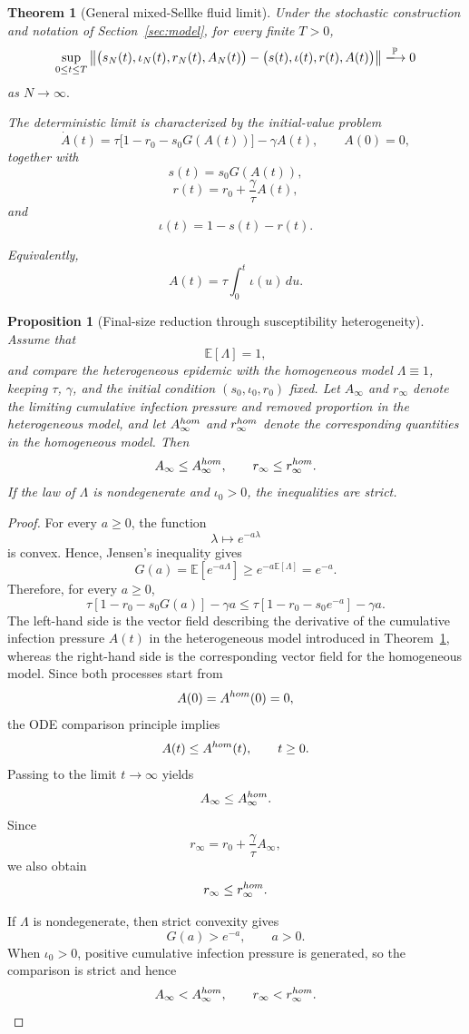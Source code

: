 \documentclass[10pt,a4paper]{amsart}
\newtheorem{theorem}{Theorem}
\newtheorem{proposition}{Proposition}
\newcommand{\E}{\mathbb{E}}
\newcommand{\Pp}{\mathbb{P}}
\begin{document}
\begin{theorem}[General mixed-Sellke fluid limit]\label{thm:1}
Under the stochastic construction and notation of Section~\ref{sec:model}, for every finite \(T>0\),
\[
\sup_{0\leq t\leq T}
\left\|
\bigl(s_N(t),\iota_N(t),r_N(t),A_N(t)\bigr)
-
\bigl(s(t),\iota(t),r(t),A(t)\bigr)
\right\|
\xlongrightarrow{\Pp}0
\]
as $N\to\infty.$

The deterministic limit is characterized by the  initial-value problem
\[
\dot A(t)
=
\tau\bigl[1-r_0-s_0G(A(t))\bigr]
-\gamma A(t),
\qquad
A(0)=0,
\]
together with
\[
s(t)=s_0G(A(t)),
\]
\[
r(t)=r_0+\frac{\gamma}{\tau}A(t),
\]
and
\[
\iota(t)=1-s(t)-r(t).
\]

Equivalently,
\[
A(t)=\tau\int_0^t\iota(u)\,du.
\]
\end{theorem}

\begin{proposition}[Final-size reduction through susceptibility heterogeneity]
\label{thm:final_size}
Assume that
\[
\E[\Lambda]=1,
\]
and compare the heterogeneous epidemic with the homogeneous model
\(\Lambda\equiv 1\), keeping \(\tau\), \(\gamma\), and the initial condition
\((s_0,\iota_0,r_0)\) fixed. Let \(A_\infty\) and \(r_\infty\) denote the
limiting cumulative infection pressure and removed proportion in the
heterogeneous model, and let \(A_\infty^{\rm hom}\) and
\(r_\infty^{\rm hom}\) denote the corresponding quantities in the
homogeneous model. Then
\[
A_\infty\leq A_\infty^{\rm hom},
\qquad
r_\infty\leq r_\infty^{\rm hom}.
\]
If the law of \(\Lambda\) is nondegenerate and \(\iota_0>0\), the inequalities
are strict.
\end{proposition}

\begin{proof}
For every \(a\geq 0\), the function
\[
\lambda\longmapsto e^{-a\lambda}
\]
is convex. Hence, Jensen's inequality gives
\[
G(a)
=
\E\!\left[e^{-a\Lambda}\right]
\geq
e^{-a\E[\Lambda]}
=
e^{-a}.
\]
Therefore, for every \(a\geq0\),
\[
\tau\left[1-r_0-s_0G(a)\right]-\gamma a
\leq
\tau\left[1-r_0-s_0e^{-a}\right]-\gamma a.
\]
The left-hand side is the vector field describing the derivative of the cumulative infection pressure \(A(t)\) in the heterogeneous model introduced in Theorem~\ref{thm:1}, whereas the right-hand side is the corresponding vector field for the homogeneous model.
 Since both processes
start from
\[
A(0)=A^{\rm hom}(0)=0,
\]
the  ODE comparison principle implies
\[
A(t)\leq A^{\rm hom}(t),
\qquad t\geq0.
\]
Passing to the limit \(t\to\infty\) yields
\[
A_\infty\leq A_\infty^{\rm hom}.
\]
Since
\[
r_\infty
=
r_0+\frac{\gamma}{\tau}A_\infty,
\]
we also obtain
\[
r_\infty\leq r_\infty^{\rm hom}.
\]

If \(\Lambda\) is nondegenerate, then strict convexity gives
\[
G(a)>e^{-a},
\qquad a>0.
\]
When \(\iota_0>0\), positive cumulative infection pressure is generated, so
the comparison is strict and hence
\[
A_\infty<A_\infty^{\rm hom},
\qquad
r_\infty<r_\infty^{\rm hom}.
\]
\end{proof}
\end{document}
